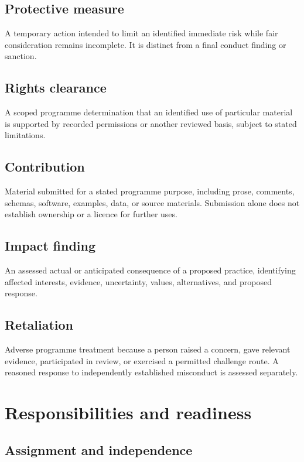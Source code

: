 \documentclass[11pt,a4paper]{article}
\begin{document}
\subsection{Protective measure}
A temporary action intended to limit an identified immediate risk while fair consideration remains incomplete. It is distinct from a final conduct finding or sanction.

\subsection{Rights clearance}
A scoped programme determination that an identified use of particular material is supported by recorded permissions or another reviewed basis, subject to stated limitations.

\subsection{Contribution}
Material submitted for a stated programme purpose, including prose, comments, schemas, software, examples, data, or source materials. Submission alone does not establish ownership or a licence for further uses.

\subsection{Impact finding}
An assessed actual or anticipated consequence of a proposed practice, identifying affected interests, evidence, uncertainty, values, alternatives, and proposed response.

\subsection{Retaliation}
Adverse programme treatment because a person raised a concern, gave relevant evidence, participated in review, or exercised a permitted challenge route. A reasoned response to independently established misconduct is assessed separately.

\section{Responsibilities and readiness}
\subsection{Assignment and independence}
\end{document}

